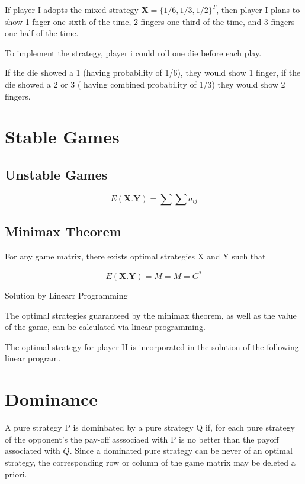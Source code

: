 \documentclass[]{report}
\begin{document}
If player I adopts the mixed strategy $\boldsymbol{X} =\{1/6,1/3,1/2\}^T$, then player I plans to show 1 fnger one-sixth of the time, 2 fingers one-third of the time, and 3 fingers one-half of the time.

To implement the strategy, player i could roll one die before each play.

If the die showed a 1 (having probability of 1/6), they would show 1 finger, if the die showed a 2 or 3 ( having combined probability of 1/3)
they would show 2 fingers.


\section{Stable Games}



\subsection{Unstable Games}

\[ E(\boldsymbol{X}.\boldsymbol{Y}) = \sum \sum a_{ij} \]


\subsection{Minimax Theorem}
For any game matrix, there exists optimal strategies X and Y such that

\[ E(\boldsymbol{X}.\boldsymbol{Y}) = M = M = G^{\ast} \]


Solution by Linearr Programming

The optimal strategies guaranteed by the minimax theorem, as well as the value of the game, can be calculated via linear programming.

The optimal strategy for player II is incorporated in the solution of the following linear program.




\section{Dominance}

A pure strategy P is dominbated by a pure strategy Q if, for each pure strategy of the opponent's the pay-off asssociaed
with P is no better than the payoff associated with $Q$. Since a dominated pure strategy
can be never of an optimal strategy, the corresponding row or column of the game matrix may be deleted a priori.
\end{document}
